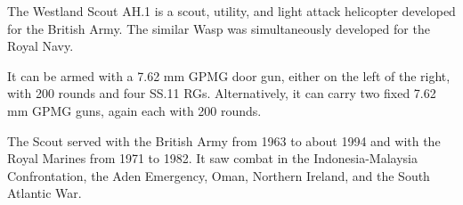 

The Westland Scout AH.1 is a scout, utility, and light attack helicopter developed for the British Army. The similar Wasp was simultaneously developed for the Royal Navy.

It can be armed with a 7.62 mm GPMG door gun, either on the left of the right, with 200 rounds and four SS.11 RGs. Alternatively, it can carry two fixed 7.62 mm GPMG guns, again each with 200 rounds.

The Scout served with the British Army from 1963 to about 1994 and with the Royal Marines from 1971 to 1982. It saw combat in the Indonesia-Malaysia Confrontation, the Aden Emergency, Oman, Northern Ireland, and the South Atlantic War.
